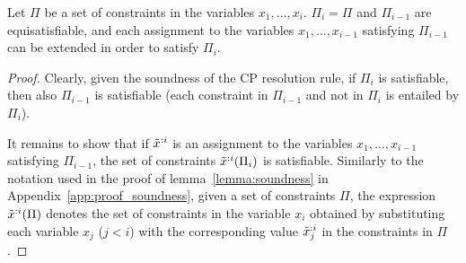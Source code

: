 
\begin{lem}%
    Let $\Pi$ be a set of constraints in the variables $x_1, \ldots, x_i$. $\Pi_i = \Pi$ and $\Pi_{i-1}$ are equisatisfiable, and each assignment to the variables $x_1, \ldots, x_{i-1}$ satisfying $\Pi_{i-1}$ can be extended in order to satisfy $\Pi_i$. 
\end{lem}

\begin{proof}

    Clearly, given the soundness of the CP resolution rule, if $\Pi_i$ is satisfiable, then also $\Pi_{i-1}$ is satisfiable (each constraint in $\Pi_{i-1}$ and not in $\Pi_i$ is entailed by $\Pi_i$). 
    
    It remains to show that if $\tilde{x}^{:i}$ is an assignment to the variables $x_1,\ldots,x_{i-1}$ satisfying $\Pi_{i-1}$, the set of constraints $\tilde{x}^{:i}(\Pi_i)$ is satisfiable. Similarly to the notation used in the proof of lemma~\ref{lemma:soundness} in Appendix~\ref{app:proof_soundness}, given a set of constraints $\Pi$, the expression $\tilde{x}^{:i}(\Pi)$ denotes the set of constraints in the variable $x_i$ obtained by substituting each variable $x_j$ ($j < i$) with the corresponding value $\tilde{x}^{:i}_j$ in the constraints in $\Pi$.


\end{proof}
